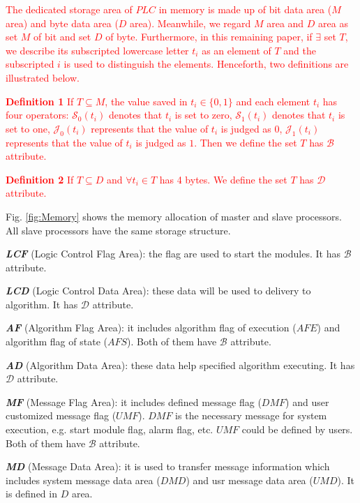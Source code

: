 \documentclass[journal,UTF8]{IEEEtran}
\begin{document}
\textcolor{red}{The dedicated storage area of $PLC$ in memory is made up of bit data area ($M$ area) and byte data area ($D$ area). Meanwhile, we regard $M$ area and $D$ area as set $M$ of bit and set $D$ of byte. Furthermore, in this remaining paper, if $\exists$ set $T$, we describe its subscripted lowercase letter $t_i$ as an element of $T$ and the subscripted $i$ is used to distinguish the elements. Henceforth, two definitions are illustrated below.}

\textcolor{red}{\textbf{Definition 1} If $ T \subseteq M$, the value saved in $t_{i} \in \{0, 1\} $ and each element $t_i$ has four operators: $\mathcal{S}_0(t_i)$ denotes that $t_i$ is set to zero, $\mathcal{S}_1(t_i)$ denotes that $t_i$ is set to one, $\mathcal{J}_0(t_i)$ represents that the value of $t_i$ is judged as $0$, $\mathcal{J}_1(t_i)$ represents that the value of $t_i$ is judged as $1$. Then we define the set $T$ has $\mathcal{B}$ attribute.}

\textcolor{red}{\textbf{Definition 2} If $ T \subseteq D$ and $\forall t_{i} \in T$ has 4 bytes. We define the set $T$ has $\mathcal{D}$ attribute.}


Fig. \ref{fig:Memory} shows the memory allocation of master and slave processors. All slave processors have the same storage structure.

\textbf{\emph{LCF}} (Logic Control Flag Area): the flag are used to start the modules. It has $\mathcal{B}$ attribute.

\textbf{\emph{LCD}} (Logic Control Data Area): these data will be used to delivery to algorithm. It has $\mathcal{D}$ attribute.

\textbf{\emph{AF}} (Algorithm Flag Area): it includes algorithm flag of execution ($AFE$) and algorithm flag of state ($AFS$). Both of them have $\mathcal{B}$ attribute.

\textbf{\emph{AD}} (Algorithm Data Area): these data help specified algorithm executing. It has $\mathcal{D}$ attribute.

\textbf{\emph{MF}} (Message Flag Area): it includes defined message flag ($DMF$) and user customized message flag ($UMF$). $DMF$ is the necessary message for system execution, e.g. start module flag, alarm flag, etc. $UMF$ could be defined by users. Both of them have $\mathcal{B}$ attribute.

\textbf{\emph{MD}} (Message Data Area): it is used to transfer message information which includes system message data area ($DMD$) and usr message data area ($UMD$). It is defined in $D$ area.
\end{document}
